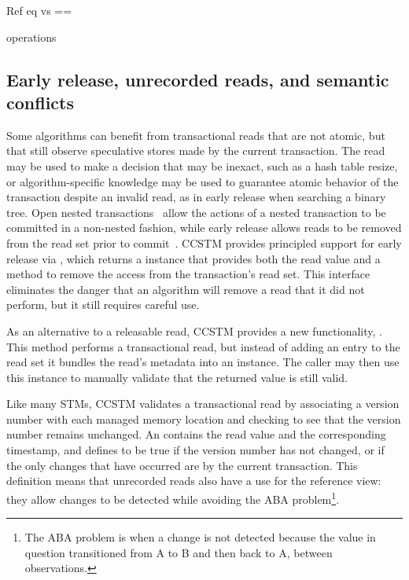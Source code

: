 Ref eq vs ==

operations

\subsection{Early release, unrecorded reads, and semantic conflicts}
\label{sec:unrecordedread}

Some algorithms can benefit from transactional reads that are not
atomic, but that still observe speculative stores made by the current
transaction.  The read may be used to make a decision that may be
inexact, such as a hash table resize, or algorithm-specific knowledge
may be used to guarantee atomic behavior of the transaction despite
an invalid read, as in early release when searching a binary tree.
Open nested transactions~\cite{opennested} allow the actions of a
nested transaction to be committed in a non-nested fashion, while
early release allows reads to be removed from the read set prior to
commit~\cite{originaldynstm}.  CCSTM provides principled support for
early release via , which returns
a  instance that provides both the read value
and a method to remove the access from the transaction's read set.
This interface eliminates the danger that an algorithm will remove a
read that it did not perform, but it still requires careful use.

As an alternative to a releasable read, CCSTM provides a new
functionality, .  This method performs a
transactional read, but instead of adding an entry to the read set it
bundles the read's metadata into an  instance.
The caller may then use this instance to manually validate that the
returned value is still valid.

Like many STMs, CCSTM validates a transactional read by associating a
version number with each managed memory location and checking to see
that the version number remains unchanged.  An 
contains the read value and the corresponding timestamp, and defines
 to be true if the version number has not changed, or
if the only changes that have occurred are by the current transaction.
This definition means that unrecorded reads also have a use for the
 reference view: they allow changes to be detected while
avoiding the ABA problem\footnote{The ABA problem is when a change is
not detected because the value in question transitioned from A to B and
then back to A, between observations.}.

